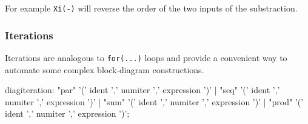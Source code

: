 For example \lstinline'Xi(-)' will reverse the order of the two inputs of the substraction.






\subsubsection{Iterations} 
Iterations are analogous to \lstinline'for(...)' loops and provide a convenient way to automate some complex block-diagram constructions. 


\begin{rail}
diagiteration: "par" '(' ident ',' numiter ',' expression ')'
           | "seq" '(' ident ',' numiter ',' expression ')'
           | "sum" '(' ident ',' numiter ',' expression ')'
           | "prod" '(' ident ',' numiter ',' expression ')';
\end{rail}

